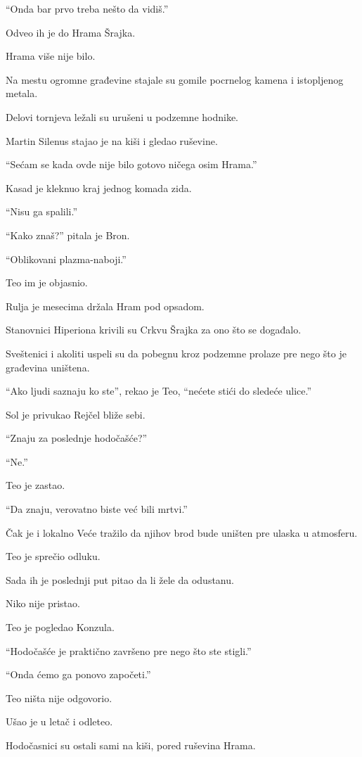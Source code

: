 ``Onda bar prvo treba nešto da vidiš.''

\bigskip

Odveo ih je do Hrama Šrajka.

Hrama više nije bilo.

Na mestu ogromne građevine stajale su gomile pocrnelog kamena i istopljenog metala.

Delovi tornjeva ležali su urušeni u podzemne hodnike.

Martin Silenus stajao je na kiši i gledao ruševine.

``Sećam se kada ovde nije bilo gotovo ničega osim Hrama.''

Kasad je kleknuo kraj jednog komada zida.

``Nisu ga spalili.''

``Kako znaš?'' pitala je Bron.

``Oblikovani plazma-naboji.''

Teo im je objasnio.

Rulja je mesecima držala Hram pod opsadom.

Stanovnici Hiperiona krivili su Crkvu Šrajka za ono što se događalo.

Sveštenici i akoliti uspeli su da pobegnu kroz podzemne prolaze pre nego što je građevina uništena.

``Ako ljudi saznaju ko ste'', rekao je Teo, ``nećete stići do sledeće ulice.''

Sol je privukao Rejčel bliže sebi.

``Znaju za poslednje hodočašće?''

``Ne.''

Teo je zastao.

``Da znaju, verovatno biste već bili mrtvi.''

Čak je i lokalno Veće tražilo da njihov brod bude uništen pre ulaska u atmosferu.

Teo je sprečio odluku.

Sada ih je poslednji put pitao da li žele da odustanu.

Niko nije pristao.

Teo je pogledao Konzula.

``Hodočašće je praktično završeno pre nego što ste stigli.''

``Onda ćemo ga ponovo započeti.''

Teo ništa nije odgovorio.

Ušao je u letač i odleteo.

Hodočasnici su ostali sami na kiši, pored ruševina Hrama.

